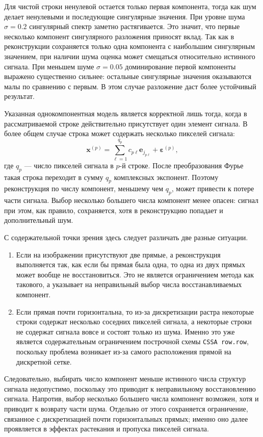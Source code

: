 Для чистой строки ненулевой остается только первая компонента, тогда как шум делает ненулевыми и последующие сингулярные значения. При уровне шума $\sigma=0.2$ сингулярный спектр заметно растягивается. Это значит, что первые несколько компонент сингулярного разложения приносят вклад. Так как в реконструкции сохраняется только одна компонента с наибольшим сингулярным значением, при наличии шума оценка может смещаться относительно истинного сигнала. При меньшем шуме $\sigma=0.05$ доминирование первой компоненты выражено существенно сильнее: остальные сингулярные значения оказываются малы по сравнению с первым. В этом случае разложение даст более устойчивый результат.

Указанная однокомпонентная модель является корректной лишь тогда, когда в рассматриваемой строке действительно присутствует один элемент сигнала. В более общем случае строка может содержать несколько пикселей сигнала:
\[
\mathbf{x}^{(p)} = \sum_{\ell=1}^{q_p} c_{p\ell}\mathbf{e}_{j_{p\ell}} + \boldsymbol{\varepsilon}^{(p)},
\]
где $q_p$ --- число пикселей сигнала в $p$-й строке. После преобразования Фурье такая строка переходит в сумму $q_p$ комплексных экспонент. Поэтому реконструкция по числу компонент, меньшему чем $q_p$, может привести к потере части сигнала. Выбор несколько большего числа компонент менее опасен: сигнал при этом, как правило, сохраняется, хотя в реконструкцию попадает и дополнительный шум.

С содержательной точки зрения здесь следует различать две разные ситуации.
\begin{enumerate}
	\item Если на изображении присутствуют две прямые, а реконструкция выполняется так, как если бы прямая была одна, то одна из двух прямых может вообще не восстановиться. Это не является ограничением метода как такового, а указывает на неправильный выбор числа восстанавливаемых компонент.
	\item Если прямая почти горизонтальна, то из-за дискретизации растра некоторые строки содержат несколько соседних пикселей сигнала, а некоторые строки не содержат сигнала вовсе и состоят только из шума. Именно это уже является содержательным ограничением построчной схемы \texttt{CSSA row.row}, поскольку проблема возникает из-за самого расположения прямой на дискретной сетке.
\end{enumerate}

Следовательно, выбирать число компонент меньше истинного числа структур сигнала недопустимо, поскольку это приводит к неправильному восстановлению сигнала. Напротив, выбор несколько большего числа компонент возможен, хотя и приводит к возврату части шума. Отдельно от этого сохраняется ограничение, связанное с дискретизацией почти горизонтальных прямых; именно оно далее проявляется в эффектах растекания и пропуска пикселей сигнала.

